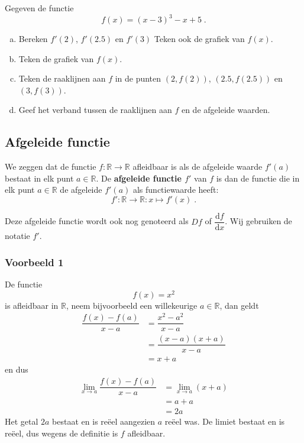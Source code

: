 \documentclass[12pt]{article}
\newenvironment{definitie}
{
  \begin{mdframed}[nobreak=true,frametitle={Definitie}]
  }{%
  \end{mdframed}
}
\begin{document}
\begin{oefening}
  Gegeven de functie
  $$f(x)=(x-3)^3-x+5\;.$$
  \begin{enumerate}[(a)]
  \item Bereken $f'(2)$, $f'(2.5)$ en $f'(3)$ Teken ook de grafiek van $f(x)$.
  \item Teken de grafiek van $f(x)$.
  \item Teken de raaklijnen aan $f$ in de punten $(2, f(2))$, $(2.5, f(2.5))$ en $(3, f(3))$.
  \item Geef het verband tussen de raaklijnen aan $f$ en de afgeleide waarden.
  \end{enumerate}
\end{oefening}

\pagebreak
\subsection{Afgeleide functie}

\begin{definitie}
  We zeggen dat de functie $f:\mathbb{R}\to\mathbb{R}$ afleidbaar is als de afgeleide waarde $f'(a)$ bestaat in elk punt $a\in\mathbb{R}$. De {\bf afgeleide functie $f'$} van $f$ is dan de functie die in elk punt $a\in\mathbb{R}$ de afgeleide $f'(a)$ als functiewaarde heeft:
  $$f':\mathbb{R}\to\mathbb{R}:x\mapsto f'(x)\;.$$
\end{definitie}

Deze afgeleide functie wordt ook nog genoteerd als $Df$ of $\dfrac{\mbox{d}f}{\mbox{d}x}$. Wij gebruiken de notatie $f'$.


\subsubsection*{Voorbeeld 1}

De functie
$$f(x)=x^2$$
is afleidbaar in $\mathbb{R}$, neem bijvoorbeeld een willekeurige $a\in\mathbb{R}$, dan geldt
\begin{align*}
  \dfrac{f(x)-f(a)}{x-a} &= \dfrac{x^2-a^2}{x-a}\\
                         &= \dfrac{(x-a)(x+a)}{x-a}\\
                         &= x+a
\end{align*}
en dus
\begin{align*}
  \lim_{x\to a}\dfrac{f(x)-f(a)}{x-a} &= \lim_{x\to a}(x+a)\\
                                      &= a+a\\
                                      &= 2a
\end{align*}
Het getal $2a$ bestaat en is reëel aangezien $a$ reëel was. De limiet bestaat en is reëel, dus wegens de definitie is $f$ afleidbaar.
\end{document}
